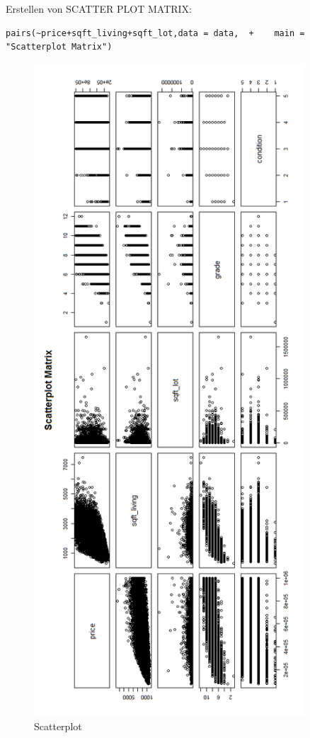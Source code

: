 Erstellen von SCATTER PLOT MATRIX:
\begin{lstlisting}
pairs(~price+sqft_living+sqft_lot,data = data,  +    main = "Scatterplot Matrix")
\end{lstlisting}

\begin{figure}[!htb]
        \begin{minipage}{1\textwidth}
                \centering
                \includegraphics[width=0.90\textwidth]{pics/rjdbc6.png}\par\vspace{0cm}
                \caption{Scatterplot}
                \label{fig:rjdbc6}
        \end{minipage}
\end{figure}

